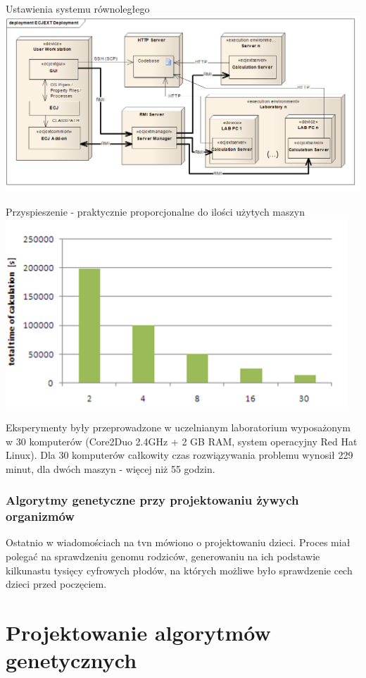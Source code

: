 \documentclass{article}
\begin{document}
    Ustawienia systemu równoległego \includegraphics{pics/ecjext-depl.png}

    Przyspieszenie - praktycznie proporcjonalne do ilości użytych maszyn
\includegraphics{pics/ecjext-speedup.png}

    Eksperymenty były przeprowadzone w uczelnianym laboratorium wyposażonym
w 30 komputerów (Core2Duo 2.4GHz + 2 GB RAM, system operacyjny Red Hat
Linux). Dla 30 komputerów całkowity czas rozwiązywania problemu wynosił
229 minut, dla dwóch maszyn - więcej niż 55 godzin.

    \subsubsection{Algorytmy genetyczne przy projektowaniu żywych
organizmów}

Ostatnio w wiadomościach na tvn mówiono o projektowaniu dzieci. Proces
miał polegać na sprawdzeniu genomu rodziców, generowaniu na ich
podstawie kilkunastu tysięcy cyfrowych płodów, na których możliwe było
sprawdzenie cech dzieci przed poczęciem.

    \section{Projektowanie algorytmów genetycznych}
\end{document}
